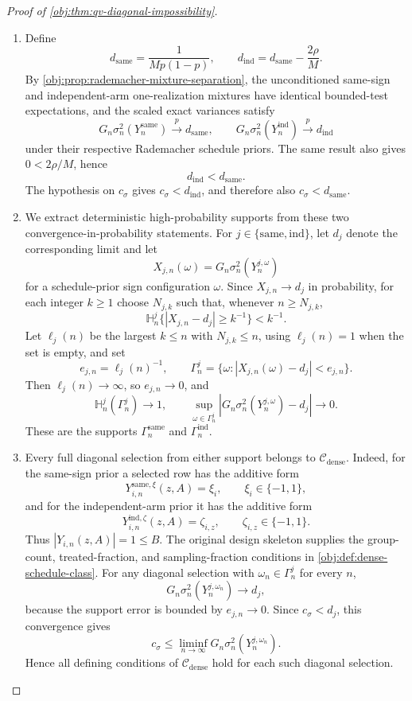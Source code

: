 \begin{proof}[Proof of \cref{obj:thm:qv-diagonal-impossibility}]
\begin{enumerate}
\item Define
\[
d_{\mathrm{same}}=\frac{1}{M p(1-p)},
\qquad
d_{\mathrm{ind}}=d_{\mathrm{same}}-\frac{2\rho}{M}.
\]
By \cref{obj:prop:rademacher-mixture-separation}, the unconditioned same-sign and independent-arm one-realization mixtures have identical bounded-test expectations, and the scaled exact variances satisfy
\[
G_n\sigma_n^2(Y_n^{\mathrm{same}})\xrightarrow{p}d_{\mathrm{same}},
\qquad
G_n\sigma_n^2(Y_n^{\mathrm{ind}})\xrightarrow{p}d_{\mathrm{ind}}
\]
under their respective Rademacher schedule priors. The same result also gives \(0<2\rho/M\), hence
\[
d_{\mathrm{ind}}<d_{\mathrm{same}}.
\]
The hypothesis on \(c_\sigma\) gives \(c_\sigma<d_{\mathrm{ind}}\), and therefore also \(c_\sigma<d_{\mathrm{same}}\). %

\item We extract deterministic high-probability supports from these two convergence-in-probability statements. For \(j\in\{\mathrm{same},\mathrm{ind}\}\), let \(d_j\) denote the corresponding limit and let
\[
X_{j,n}(\omega)=G_n\sigma_n^2(Y_n^{j,\omega})
\]
for a schedule-prior sign configuration \(\omega\). Since \(X_{j,n}\to d_j\) in probability, for each integer \(k\ge1\) choose \(N_{j,k}\) such that, whenever \(n\ge N_{j,k}\),
\[
\mathbb H_n^j\{|X_{j,n}-d_j|\ge k^{-1}\}<k^{-1}.
\]
Let \(\ell_j(n)\) be the largest \(k\le n\) with \(N_{j,k}\le n\), using \(\ell_j(n)=1\) when the set is empty, and set
\[
e_{j,n}=\ell_j(n)^{-1},
\qquad
\Gamma_n^j=\{\omega: |X_{j,n}(\omega)-d_j|<e_{j,n}\}.
\]
Then \(\ell_j(n)\to\infty\), so \(e_{j,n}\to0\), and
\[
\mathbb H_n^j(\Gamma_n^j)\to1,
\qquad
\sup_{\omega\in\Gamma_n^j}|G_n\sigma_n^2(Y_n^{j,\omega})-d_j|\to0 .
\]
These are the supports \(\Gamma_n^{\mathrm{same}}\) and \(\Gamma_n^{\mathrm{ind}}\). %

\item Every full diagonal selection from either support belongs to \(\mathcal C_{\mathrm{dense}}\). Indeed, for the same-sign prior a selected row has the additive form
\[
Y_{i,n}^{\mathrm{same},\xi}(z,A)=\xi_i,\qquad \xi_i\in\{-1,1\},
\]
and for the independent-arm prior it has the additive form
\[
Y_{i,n}^{\mathrm{ind},\zeta}(z,A)=\zeta_{i,z},\qquad \zeta_{i,z}\in\{-1,1\}.
\]
Thus \(|Y_{i,n}(z,A)|=1\le B\). The original design skeleton supplies the group-count, treated-fraction, and sampling-fraction conditions in \cref{obj:def:dense-schedule-class}. For any diagonal selection with \(\omega_n\in\Gamma_n^j\) for every \(n\),
\[
G_n\sigma_n^2(Y_n^{j,\omega_n})\to d_j,
\]
because the support error is bounded by \(e_{j,n}\to0\). Since \(c_\sigma<d_j\), this convergence gives
\[
c_\sigma\le \liminf_{n\to\infty}G_n\sigma_n^2(Y_n^{j,\omega_n}).
\]
Hence all defining conditions of \(\mathcal C_{\mathrm{dense}}\) hold for each such diagonal selection. %


\end{enumerate}
\end{proof}
